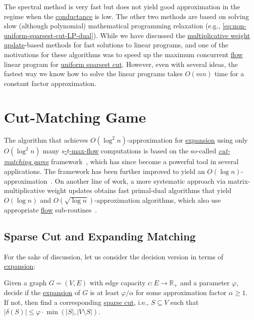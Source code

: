 The spectral method is very fast but does not yield good approximation in the regime when the \hyperref[def:conductance]{conductance} is low. The other two methods are based on solving slow (although polynomial) mathematical programming relaxation (e.g., \autoref{eq:non-uniform-sparsest-cut-LP-dual}). While we have discussed the \hyperref[algo:MWU-discrete-non-uniform]{multiplicative weight update}-based methods for fast solutions to linear programs, and one of the motivations for these algorithms was to speed up the maximum concurrent \hyperref[def:flow]{flow} linear program for \hyperref[prb:sparsest-cut]{uniform sparsest cut}. However, even with several ideas, the fastest way we know how to solve the linear programs takes \(O(mn)\) time for a constant factor approximation.

\section{Cut-Matching Game}
The algorithm that achieves \(O(\log ^2 n)\)-approximation for \hyperref[def:expansion]{expansion} using only \(O(\log ^2 n)\) many \hyperref[prb:s-t-max-flow]{\(s\)-\(t\)-max-flow} computations is based on the so-called \hyperref[def:cut-matching-game]{\emph{cut-matching game}} framework~\cite{khandekar2009graph}, which has since become a powerful tool in several applications. The framework has been further improved to yield an \(O(\log n)\)-approximation~\cite{orecchia2008partitioning}. On another line of work, a more systematic approach via matrix-multiplicative weight updates obtains fast primal-dual algorithms that yield \(O(\log n)\) and \(O(\sqrt{\log n} )\)-approximation algorithms, which also use appropriate \hyperref[def:flow]{flow} sub-routines~\cite{arora2007combinatorial}.

\subsection{Sparse Cut and Expanding Matching}
For the sake of discussion, let us consider the decision version in terms of \hyperref[def:expansion]{expansion}:

\begin{problem}[Expansion]\label{prb:expansion}
Given a graph \(G = (V, E)\) with edge capacity \(c\colon E \to \mathbb{R} _{+}\) and a parameter \(\varphi \), decide if the \hyperref[def:expansion]{expansion} of \(G\) is at least \(\varphi / \alpha \) for some approximation factor \(\alpha \geq 1\). If not, then find a corresponding \hyperref[prb:sparsest-cut]{sparse cut}, i.e., \(S \subseteq V\) such that \(\lvert \delta (S) \rvert \leq \varphi \cdot \min (\lvert S \rvert , \lvert V \setminus S \rvert )\).
\end{problem}


